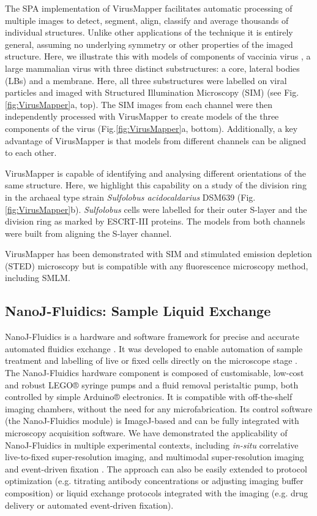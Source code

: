  The SPA implementation of VirusMapper facilitates automatic processing of multiple images to detect, segment, align, classify and average thousands of individual structures. Unlike other applications of the technique it is entirely general, assuming no underlying symmetry or other properties of the imaged structure. Here, we illustrate this with models of components of vaccinia virus \cite{FieldsVirology2013}, a large mammalian virus with three distinct substructures: a core, lateral bodies (LBs) and a membrane. Here, all three substructures were labelled on viral particles and imaged with Structured Illumination Microscopy (SIM) \cite{gustafsson2000surpassing} (see Fig.\ref{fig:VirusMapper}a, top). The SIM images from each channel were then independently processed with VirusMapper to create models of the three components of the virus (Fig.\ref{fig:VirusMapper}a, bottom). Additionally, a key advantage of VirusMapper is that models from different channels can be aligned to each other.

 VirusMapper is capable of identifying and analysing different orientations of the same structure. Here, we highlight this capability on a study of the division ring in the archaeal type strain \emph{Sulfolobus acidocaldarius} DSM639 (Fig.\ref{fig:VirusMapper}b). \emph{Sulfolobus} cells were labelled for their outer S-layer and the division ring as marked by ESCRT-III proteins. The models from both channels were built from aligning the S-layer channel.

 VirusMapper has been demonstrated with SIM and stimulated emission depletion (STED) microscopy \cite{Gray2016} but is compatible with any fluorescence microscopy method, including SMLM.

\subsection*{NanoJ-Fluidics: Sample Liquid Exchange}

 NanoJ-Fluidics is a hardware and software framework for precise and accurate automated fluidics exchange \cite{almada2018automating}. It was developed to enable automation of sample treatment and labelling of live or fixed cells directly on the microscope stage \cite{dix2018role}. The NanoJ-Fluidics hardware component is composed of customisable, low-cost and robust LEGO® syringe pumps and a fluid removal peristaltic pump, both controlled by simple Arduino® electronics. It is compatible with off-the-shelf imaging chambers, without the need for any microfabrication. Its control software (the NanoJ-Fluidics module) is ImageJ-based and can be fully integrated with microscopy acquisition software. We have demonstrated the applicability of NanoJ-Fluidics in multiple experimental contexts, including \textit{in-situ} correlative live-to-fixed super-resolution imaging, and multimodal super-resolution imaging and event-driven fixation \cite{almada2018automating}. The approach can also be easily extended to protocol optimization (e.g. titrating antibody concentrations or adjusting imaging buffer composition) or liquid exchange protocols integrated with the imaging (e.g. drug delivery or automated event-driven fixation).

